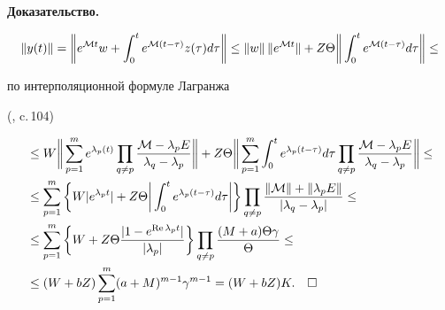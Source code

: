 




{\bf Доказательство.}


$$\|y(t)\|=


\bigg\|e^{{\cal{M}}t}w+


\int_{0}^{t}


e^{{\cal{M}}(t-\tau)}z(\tau)d\tau\bigg\|\leq


\|w\|\,\|e^{{\cal{M}}t}\|+Z\Theta


\bigg\|\int_{0}^{t}


e^{{\cal{M}}(t-\tau)}d\tau\bigg\|\leq


$$


по интерполяционной формуле Лагранжа


(\cite{Gantmah}, c.\,104)


\begin{align*}


&\leq W


\bigg\|\sum\limits_{p=1}^{m}


e^{\lambda_p(t)}


\prod\limits_{q\neq p}


\frac{{\cal{M}}-\lambda_pE}{\lambda_q-\lambda_p}\bigg\|


+Z\Theta


\bigg\|\sum\limits_{p=1}^{m}


\int_{0}^{t}e^{\lambda_p(t-\tau)}d\tau


\prod\limits_{q\neq p}


\frac{{\cal{M}}-\lambda_pE}{\lambda_q-\lambda_p}\bigg\|\leq \\


%


&\leq \sum\limits_{p=1}^{m}\bigg\{ W|e^{\lambda_pt}|+Z\Theta


\bigg|\int_{0}^{t}e^{\lambda_p(t-\tau)}d\tau\bigg|\bigg\}


\prod\limits_{q\neq p}


\frac{\|{\cal{M}}\|+\|\lambda_pE\|}{|\lambda_q-\lambda_p|}\leq \\


%


&\leq \sum\limits_{p=1}^{m}\bigg\{ W+Z\Theta


\frac{|1-e^{\text{Re\,}\lambda_pt}|}{|\lambda_p|}\bigg\}


\prod\limits_{q\neq p}


\frac{(M+a) \Theta \gamma}{\Theta }\leq \\


%


&\leq (W+bZ)\sum\limits_{p=1}^{m}


(a+M)^{m-1}\gamma^{m-1}


=(W+bZ)K.\quad\square


\end{align*}








